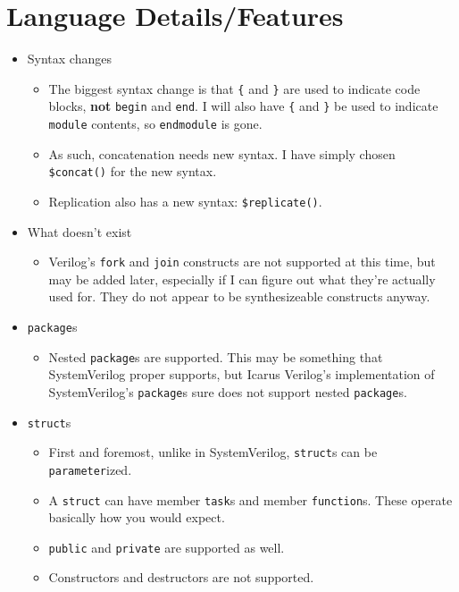 \documentclass{article}
\begin{document}
	\section{Language Details/Features}
		\begin{itemize}
		\item Syntax changes
			\begin{itemize}
			\item The biggest syntax change is that \texttt{\{} and
			\texttt{\}} are used to indicate code blocks, \textbf{not}
			\texttt{begin} and \texttt{end}.  I will also have \texttt{\{}
			and \texttt{\}} be used to indicate \texttt{module} contents,
			so \texttt{endmodule} is gone.
			\item As such, concatenation needs new syntax.  I have simply
			chosen \texttt{\$concat()} for the new syntax.
			\item Replication also has a new syntax:
			\texttt{\$replicate()}.
			\end{itemize}
		\item What doesn't exist
			\begin{itemize}
			\item Verilog's \texttt{fork} and \texttt{join} constructs are
			not supported at this time, but may be added later, especially
			if I can figure out what they're actually used for.  They do
			not appear to be synthesizeable constructs anyway.
			\end{itemize}
		\item \texttt{package}s
			\begin{itemize}
			\item Nested \texttt{package}s are supported.  This may be
			something that SystemVerilog proper supports, but Icarus
			Verilog's implementation of SystemVerilog's \texttt{package}s
			sure does not support nested \texttt{package}s.
			\end{itemize}
		\item \texttt{struct}s
			\begin{itemize}
			\item First and foremost, unlike in SystemVerilog,
			\texttt{struct}s can be \texttt{parameter}ized.
			\item A \texttt{struct} can have member \texttt{task}s and
			member \texttt{function}s.  These operate basically how you
			would expect.
			\item \texttt{public} and \texttt{private} are supported as
			well.
			\item Constructors and destructors are not supported.

\end{itemize}
\end{itemize}
\end{document}

